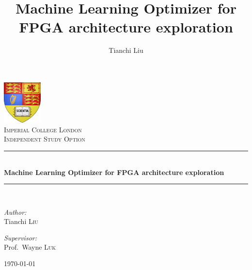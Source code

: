 \documentclass[11pt, runningheads,a4paper]{llncs}
\newcommand{\HRule}{\rule{\linewidth}{0.5mm}}
\begin{document}
\thispagestyle{empty}
\begin{center}
\includegraphics[width=0.15\textwidth]{imperial-college-london-logo.png}~\\[1cm]
\textsc{\LARGE Imperial College London}\\[1.5cm]

\textsc{\Large Independent Study Option}\\[0.5cm]

\HRule \\[0.4cm]
{ \huge \bfseries Machine Learning Optimizer for FPGA architecture exploration}\\[0.4cm]

\HRule \\[1.5cm]

\begin{minipage}{0.4\textwidth}
\begin{flushleft} \large
\emph{Author:}\\
Tianchi \textsc{Liu}
\end{flushleft}
\end{minipage}
\begin{minipage}{0.4\textwidth}
\begin{flushright} \large
\emph{Supervisor:} \\
Prof.~Wayne \textsc{Luk}
\end{flushright}
\end{minipage}

\vfill

{\large \today}

\end{center}



\setcounter{page}{1}
\title{Machine Learning Optimizer for FPGA architecture exploration}


%
%
\author{Tianchi Liu}
%
\end{document}
